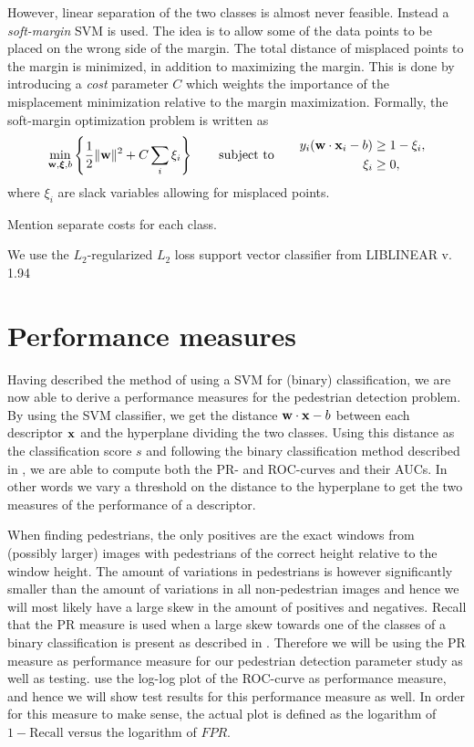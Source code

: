 \documentclass[thesis.tex]{subfiles}
\begin{document}
However, linear separation of the two classes is almost never feasible. Instead a \emph{soft-margin} SVM is used. The idea is to allow some of the data points to be placed on the wrong side of the margin. The total distance of misplaced points to the margin is minimized, in addition to maximizing the margin. This is done by introducing a \emph{cost} parameter $C$ which weights the importance of the misplacement minimization relative to the margin maximization. Formally, the soft-margin optimization problem is written as
%
\begin{align*}
\min_{\mathbf{w},\boldsymbol{\xi},b} \left\{ \frac12 \| \mathbf{w} \|^2 + C \sum_i \xi_i \right\} \qquad \text{subject to} \qquad \begin{aligned} y_i (\mathbf{w} \cdot \mathbf{x}_i - b) &\geq 1 - \xi_i, \\ \xi_i &\geq 0, \end{aligned}
\end{align*}
%
where $\xi_i$ are slack variables allowing for misplaced points.

Mention separate costs for each class.

We use the $L_2$-regularized $L_2$ loss support vector classifier from LIBLINEAR v. 1.94 \cite{fan2008liblinear}

\section{Performance measures}

Having described the method of using a SVM for (binary) classification, we are now able to derive a performance measures for the pedestrian detection problem. By using the SVM classifier, we get the distance $\mathbf{w} \cdot \mathbf{x} - b$ between each descriptor $\mathbf{x}$ and the hyperplane dividing the two classes. Using this distance as the classification score $s$ and following the binary classification method described in , we are able to compute both the PR- and ROC-curves and their AUCs. In other words we vary a threshold on the distance to the hyperplane to get the two measures of the performance of a descriptor.

When finding pedestrians, the only positives are the exact windows from (possibly larger) images with pedestrians of the correct height relative to the window height. The amount of variations in pedestrians is however significantly smaller than the amount of variations in all non-pedestrian images and hence we will most likely have a large skew in the amount of positives and negatives.
Recall that the PR measure is used when a large skew towards one of the classes of a binary classification is present as described in . Therefore we will be using the PR measure as performance measure for our pedestrian detection parameter study as well as testing.  use the log-log plot of the ROC-curve as performance measure, and hence we will show test results for this performance measure as well. In order for this measure to make sense, the actual plot is defined as the logarithm of $1-\text{Recall}$ versus the logarithm of $FPR$.
\end{document}
